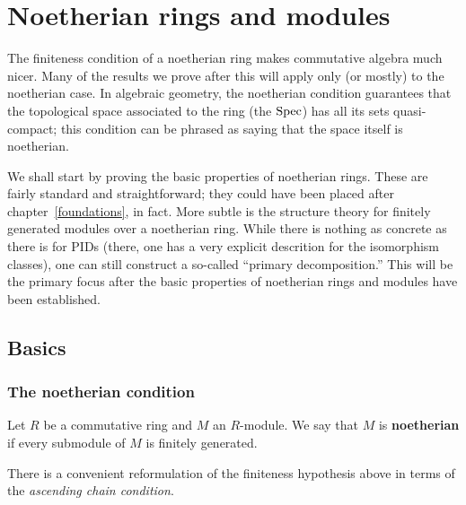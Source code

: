 \chapter{Noetherian rings and modules}

The finiteness condition of a noetherian ring makes commutative algebra much
nicer.
Many of the results we prove after this will apply only (or mostly) to the
noetherian case. In algebraic geometry, the noetherian condition guarantees
that the topological space associated to the ring (the $\mathrm{Spec} $) has all its
sets quasi-compact; this condition can be phrased as saying that the space
itself is noetherian. 

We shall start by proving the basic properties of noetherian rings. These are
fairly standard and straightforward; they could have been placed after
chapter~\ref{foundations}, in fact. More subtle is the structure theory for
finitely generated modules over a noetherian ring. While there is nothing as
concrete as there is for PIDs (there, one has a very explicit descrition for
the isomorphism classes), one can still construct a so-called ``primary
decomposition.'' This will be the primary focus after the basic properties of
noetherian rings and modules have been established.


\section{Basics}

\subsection{The noetherian condition}


\begin{definition} 
Let $R$ be a commutative ring and $M$ an $R$-module. We say that $M$ is
\textbf{noetherian} if every submodule of $M$ is finitely generated.
\end{definition} 


There is a convenient
reformulation of the finiteness hypothesis above in terms of the
\emph{ascending chain condition}.

